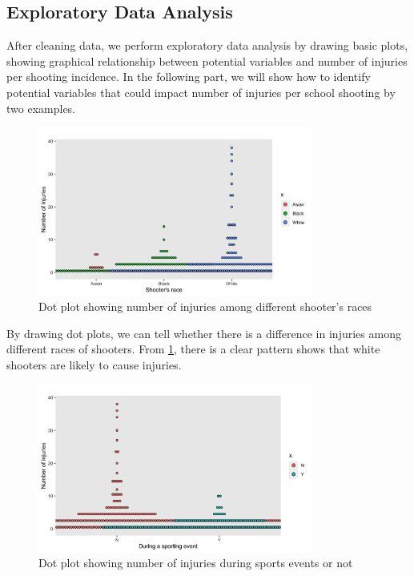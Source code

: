 \documentclass[12pt]{article}
\numberwithin{figure}{section}
\begin{document}
\subsection{Exploratory Data Analysis}

After cleaning data, we perform exploratory data analysis by drawing basic plots, showing graphical relationship between potential variables and number of injuries per shooting incidence. In the following part, we will show how to identify potential variables that could impact number of injuries per school shooting by two examples.

\begin{figure}[H]
    \centering
    \includegraphics[width=0.8\textwidth]{explore_race.png}
    \caption{Dot plot showing number of injuries among different shooter's races}
    \label{explore_race}
\end{figure}

By drawing dot plots, we can tell whether there is a difference in injuries among different races of shooters. From \ref{explore_race}, there is a clear pattern shows that white shooters are likely to cause injuries.

\begin{figure}[H]
    \centering
    \includegraphics[width=0.8\textwidth]{explore_sports.png}
    \caption{Dot plot showing number of injuries during sports events or not}
    \label{explore_sports}
\end{figure}
\end{document}
